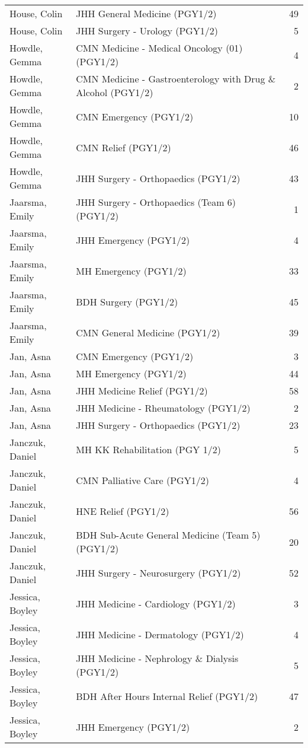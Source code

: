 \documentclass[
]{article}
\begin{document}
\begin{longtable}{llr}
House, Colin & JHH General Medicine (PGY1/2) & 49 \\ 
House, Colin & JHH Surgery - Urology (PGY1/2) & 5 \\ 
Howdle, Gemma & CMN Medicine - Medical Oncology (01) (PGY1/2) & 4 \\ 
Howdle, Gemma & CMN Medicine - Gastroenterology with Drug \& Alcohol (PGY1/2) & 2 \\ 
Howdle, Gemma & CMN Emergency (PGY1/2) & 10 \\ 
Howdle, Gemma & CMN Relief (PGY1/2) & 46 \\ 
Howdle, Gemma & JHH Surgery - Orthopaedics (PGY1/2) & 43 \\ 
Jaarsma, Emily & JHH Surgery - Orthopaedics (Team 6) (PGY1/2) & 1 \\ 
Jaarsma, Emily & JHH Emergency (PGY1/2) & 4 \\ 
Jaarsma, Emily & MH Emergency (PGY1/2) & 33 \\ 
Jaarsma, Emily & BDH Surgery (PGY1/2) & 45 \\ 
Jaarsma, Emily & CMN General Medicine (PGY1/2) & 39 \\ 
Jan, Asna & CMN Emergency (PGY1/2) & 3 \\ 
Jan, Asna & MH Emergency (PGY1/2) & 44 \\ 
Jan, Asna & JHH Medicine Relief (PGY1/2) & 58 \\ 
Jan, Asna & JHH Medicine - Rheumatology (PGY1/2) & 2 \\ 
Jan, Asna & JHH Surgery - Orthopaedics (PGY1/2) & 23 \\ 
Janczuk, Daniel & MH KK Rehabilitation (PGY 1/2) & 5 \\ 
Janczuk, Daniel & CMN Palliative Care (PGY1/2) & 4 \\ 
Janczuk, Daniel & HNE Relief (PGY1/2) & 56 \\ 
Janczuk, Daniel & BDH Sub-Acute General Medicine (Team 5) (PGY1/2) & 20 \\ 
Janczuk, Daniel & JHH Surgery - Neurosurgery (PGY1/2) & 52 \\ 
Jessica, Boyley & JHH Medicine - Cardiology (PGY1/2) & 3 \\ 
Jessica, Boyley & JHH Medicine - Dermatology (PGY1/2) & 4 \\ 
Jessica, Boyley & JHH Medicine - Nephrology \& Dialysis (PGY1/2) & 5 \\ 
Jessica, Boyley & BDH After Hours Internal Relief (PGY1/2) & 47 \\ 
Jessica, Boyley & JHH Emergency (PGY1/2) & 2 \\ 

\end{longtable}
\end{document}
